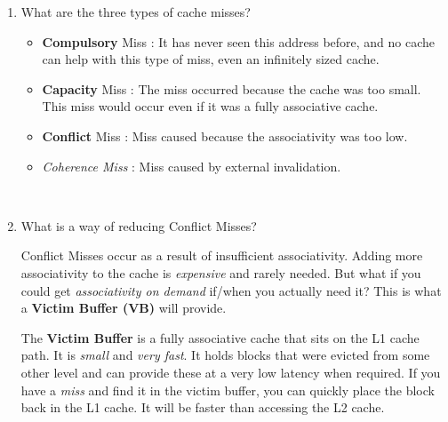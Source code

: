 \documentclass[12pt]{article}
\newenvironment{QandA}{\begin{enumerate}[label=\bfseries\arabic*.]\bfseries}
                      {\end{enumerate}}
\newenvironment{answered}{\par\quad\normalfont}{}
\begin{document}
\begin{QandA}
\begin{answered}
\textit{Q: A LOAD instruction during a \textbf{read miss} can't go on without the data so it must stall, but does a STORE instruction during a \textbf{write miss} need to stall?}

\quad No, we can actually keep going. And to do this, we require another hardware structure called the \textbf{Store Buffer}. STORE instructions put addresses / values into the store buffer and keep going. The caveat is that \textbf{LOAD} instructions must now also check the \textit{Store Buffer} in addition to Data Memory. 
\end{answered}

\ 

\item What are the three types of cache misses?
\begin{answered}
\vspace{-0.85cm}
\begin{itemize}
    \item \textbf{Compulsory} Miss : It has never seen this address before, and no cache can help with this type of miss, even an infinitely sized cache.
    \item \textbf{Capacity} Miss : The miss occurred because the cache was too small. This miss would occur even if it was a fully associative cache.
    \item \textbf{Conflict} Miss : Miss caused because the associativity was too low. 
    \item \textit{Coherence Miss} : Miss caused by external invalidation.
\end{itemize}
\end{answered}

\ 

\item What is a way of reducing Conflict Misses?
\begin{answered}
Conflict Misses occur as a result of insufficient associativity. Adding more associativity to the cache is \textit{expensive} and rarely needed. But what if you could get \textit{associativity on demand} if/when you actually need it? This is what a \textbf{Victim Buffer (VB)} will provide.

\quad The \textbf{Victim Buffer} is a fully associative cache that sits on the L1 cache path. It is \textit{small} and \textit{very fast}. It holds blocks that were evicted from some other level and can provide these at a very low latency when required. If you have a \textit{miss} and find it in the victim buffer, you can quickly place the block back in the L1 cache. It will be faster than accessing the L2 cache. 
\end{answered}


\end{QandA}
\end{document}
